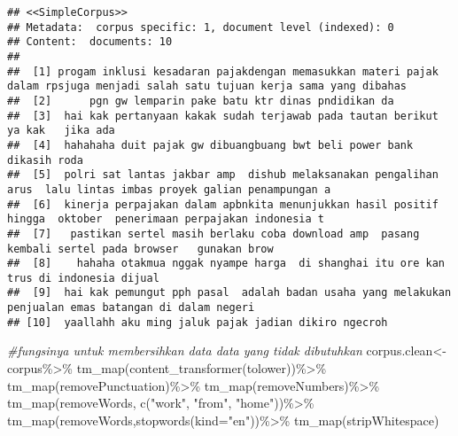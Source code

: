 \documentclass[
]{article}
\newenvironment{Shaded}{\begin{snugshade}}{\end{snugshade}}
\newcommand{\AttributeTok}[1]{\textcolor[rgb]{0.77,0.63,0.00}{#1}}
\newcommand{\CommentTok}[1]{\textcolor[rgb]{0.56,0.35,0.01}{\textit{#1}}}
\newcommand{\FunctionTok}[1]{\textcolor[rgb]{0.00,0.00,0.00}{#1}}
\newcommand{\NormalTok}[1]{#1}
\newcommand{\OtherTok}[1]{\textcolor[rgb]{0.56,0.35,0.01}{#1}}
\newcommand{\SpecialCharTok}[1]{\textcolor[rgb]{0.00,0.00,0.00}{#1}}
\newcommand{\StringTok}[1]{\textcolor[rgb]{0.31,0.60,0.02}{#1}}
\begin{document}
\begin{verbatim}
## <<SimpleCorpus>>
## Metadata:  corpus specific: 1, document level (indexed): 0
## Content:  documents: 10
## 
##  [1] progam inklusi kesadaran pajakdengan memasukkan materi pajak dalam rpsjuga menjadi salah satu tujuan kerja sama yang dibahas
##  [2]      pgn gw lemparin pake batu ktr dinas pndidikan da                                                                       
##  [3]  hai kak pertanyaan kakak sudah terjawab pada tautan berikut ya kak   jika ada                                              
##  [4]  hahahaha duit pajak gw dibuangbuang bwt beli power bank dikasih roda                                                       
##  [5]  polri sat lantas jakbar amp  dishub melaksanakan pengalihan arus  lalu lintas imbas proyek galian penampungan a            
##  [6]  kinerja perpajakan dalam apbnkita menunjukkan hasil positif  hingga  oktober  penerimaan perpajakan indonesia t            
##  [7]   pastikan sertel masih berlaku coba download amp  pasang kembali sertel pada browser   gunakan brow                        
##  [8]    hahaha otakmua nggak nyampe harga  di shanghai itu ore kan trus di indonesia dijual                                      
##  [9]  hai kak pemungut pph pasal  adalah badan usaha yang melakukan penjualan emas batangan di dalam negeri                      
## [10]  yaallahh aku ming jaluk pajak jadian dikiro ngecroh
\end{verbatim}

\begin{Shaded}
\begin{Highlighting}[]
\CommentTok{\#fungsinya untuk membersihkan data data yang tidak dibutuhkan }
\NormalTok{corpus.clean}\OtherTok{\textless{}{-}}\NormalTok{corpus}\SpecialCharTok{\%\textgreater{}\%}
    \FunctionTok{tm\_map}\NormalTok{(}\FunctionTok{content\_transformer}\NormalTok{(tolower))}\SpecialCharTok{\%\textgreater{}\%}
    \FunctionTok{tm\_map}\NormalTok{(removePunctuation)}\SpecialCharTok{\%\textgreater{}\%}
    \FunctionTok{tm\_map}\NormalTok{(removeNumbers)}\SpecialCharTok{\%\textgreater{}\%}
    \FunctionTok{tm\_map}\NormalTok{(removeWords, }\FunctionTok{c}\NormalTok{(}\StringTok{"work"}\NormalTok{, }\StringTok{"from"}\NormalTok{, }\StringTok{"home"}\NormalTok{))}\SpecialCharTok{\%\textgreater{}\%}
    \FunctionTok{tm\_map}\NormalTok{(removeWords,}\FunctionTok{stopwords}\NormalTok{(}\AttributeTok{kind=}\StringTok{"en"}\NormalTok{))}\SpecialCharTok{\%\textgreater{}\%}
    \FunctionTok{tm\_map}\NormalTok{(stripWhitespace)}
\end{Highlighting}
\end{Shaded}
\end{document}

